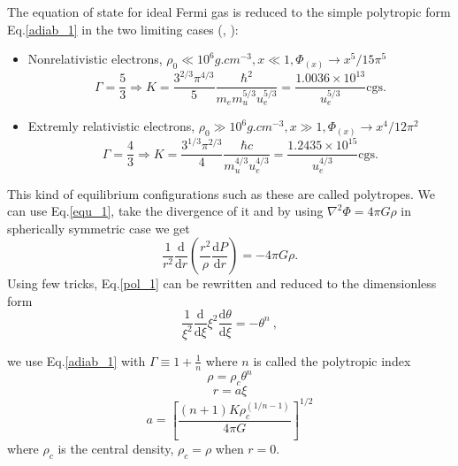 \documentclass[oneside,a4paper,11pt]{report}
\begin{document}
The equation of state for ideal Fermi gas is reduced to the simple polytropic form Eq.\eqref{adiab_1} in
the two limiting cases (\citet{2004bhwd.book.....S}, \citet{padm_vII}):
\begin{itemize}
\item Nonrelativistic electrons, $\rho_0 \ll 10^6 g.cm^{-3}, x\ll 1, \Phi_{(x)}\rightarrow x^5/15\pi^5 $
\begin{equation}
\Gamma = \frac{5}{3} \Longrightarrow  K = \frac{3^{2/3}\pi^{4/3}}{5}\frac{\hbar^2}{m_em_u^{5/3}u_e^{5/3}} = \frac{1.0036\times 10^{13}}{u_e^{5/3}} \mathrm{cgs}.
\end{equation}
\item Extremly relativistic electrons, $\rho_0 \gg 10^6 g.cm^{-3}, x\gg 1, \Phi_{(x)}\rightarrow x^4/12\pi^2 $
\begin{equation}
\Gamma = \frac{4}{3} \Longrightarrow K = \frac{3^{1/3}\pi^{2/3}}{4}\frac{\hbar c}{m_u^{4/3}u_e^{4/3}} = \frac{1.2435\times 10^{15}}{u_e^{4/3}} \mathrm{cgs}.
\end{equation}
\end{itemize}

This kind of equilibrium configurations such as these are called polytropes. We can use Eq.\eqref{equ_1}, take the divergence of it and by using $\nabla^2\Phi = 4\pi G \rho$ in spherically 
symmetric case we get  
\begin{equation}
\label{pol_1}
 \frac{1}{r^2}\frac{\mathrm{d}}{\mathrm{d}r}\left ( \frac{r^2}{\rho}\frac{\mathrm{d}P}{\mathrm{d}r} \right ) = -4\pi G\rho .
\end{equation}
Using few tricks, Eq.\eqref{pol_1} can be rewritten and reduced to the dimensionless form 
\begin{equation}
 \label{pol_2}
\frac{1}{\xi^2 }\frac{\mathrm{d}}{\mathrm{d}\xi}\xi^2\frac{\mathrm{d}\theta }{\mathrm{d}\xi } = -\theta^n \:, 
\end{equation}



we use Eq.\eqref{adiab_1} with $\Gamma \equiv 1 + \frac{1}{n}$ where $n$ is called the polytropic index
\begin{equation}
\label{pol_3}
\rho = \rho_c \theta^n  
\end{equation}
\begin{equation}
\label{pol_4}
r = a\xi
\end{equation}
\begin{equation}
\label{pol_5} 
a = \left [ \frac{\left ( n+1 \right ) K \rho_c^{\left ( 1/n-1 \right )} }{4\pi G} \right ]^{1/2}
\end{equation}
where $\rho_c$ is the central density, $\rho_c = \rho$ when $r = 0$. 
\end{document}
